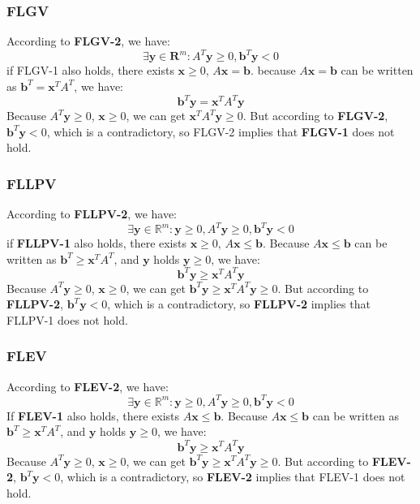 \subsubsection*{FLGV}
According to \textbf{FLGV-2}, we have:
\[\exists \textbf{y} \in \textbf{R}^{m}: A^{T}\textbf{y} \geq 0, \textbf{b}^{T}\textbf{y} < 0 \]
if FLGV-1 also holds, there exists $\textbf{x} \geq 0$, $A\textbf{x}=\textbf{b}$.
\noindent
because $A\textbf{x}=\textbf{b}$ can be written as $\textbf{b}^{T} = \textbf{x}^{T}A^{T}$, we have:
\[\textbf{b}^{T}\textbf{y}=\textbf{x}^{T}A^{T}\textbf{y}\]
Because $A^{T}\textbf{y} \geq 0$, $\textbf{x} \geq 0$, we can get $\textbf{x}^{T}A^{T}\textbf{y} \geq 0$. But according to \textbf{FLGV-2}, $\textbf{b}^{T}\textbf{y} < 0$, which is a contradictory, so FLGV-2 implies that \textbf{FLGV-1} does not hold.
\subsubsection*{FLLPV}
According to \textbf{FLLPV-2}, we have:
\[\exists \textbf{y} \in \mathbb{R}^{m}: \textbf{y} \geq 0, A^{T}\textbf{y} \geq 0, \textbf{b}^{T}\textbf{y} < 0 \]
if \textbf{FLLPV-1} also holds, there exists $\textbf{x} \geq 0$, $A\textbf{x} \leq \textbf{b}$. Because $A\textbf{x} \leq \textbf{b}$ can be written as $\textbf{b}^{T} \geq \textbf{x}^{T}A^{T}$, and $\textbf{y}$ holds $\textbf{y} \geq 0$, we have:
\[\textbf{b}^{T}\textbf{y} \geq \textbf{x}^{T}A^{T}\textbf{y}\]
Because $A^{T}\textbf{y} \geq 0$, $\textbf{x} \geq 0$, we can get $\textbf{b}^{T}\textbf{y} \geq \textbf{x}^{T}A^{T}\textbf{y} \geq 0$.
But according to \textbf{FLLPV-2}, $\textbf{b}^{T}\textbf{y} < 0$, which is a contradictory, so \textbf{FLLPV-2} implies that FLLPV-1 does not hold.
\subsubsection*{FLEV}
According to \textbf{FLEV-2}, we have:
\[\exists \textbf{y} \in \mathbb{R}^{m}: \textbf{y} \geq 0, A^{T}\textbf{y} \geq 0, \textbf{b}^{T}\textbf{y} < 0 \]
If \textbf{FLEV-1} also holds, there exists $A\textbf{x} \leq \textbf{b}$.
Because $A\textbf{x} \leq \textbf{b}$ can be written as $\textbf{b}^{T} \geq \textbf{x}^{T}A^{T}$, and $\textbf{y}$ holds $\textbf{y} \geq 0$, we have:
\[\textbf{b}^{T}\textbf{y} \geq \textbf{x}^{T}A^{T}\textbf{y}\]
Because $A^{T}\textbf{y} \geq 0$, $\textbf{x} \geq 0$, we can get $\textbf{b}^{T}\textbf{y} \geq \textbf{x}^{T}A^{T}\textbf{y} \geq 0$.
But according to \textbf{FLEV-2}, $\textbf{b}^{T}\textbf{y} < 0$, which is a contradictory, so \textbf{FLEV-2} implies that FLEV-1 does not hold.
